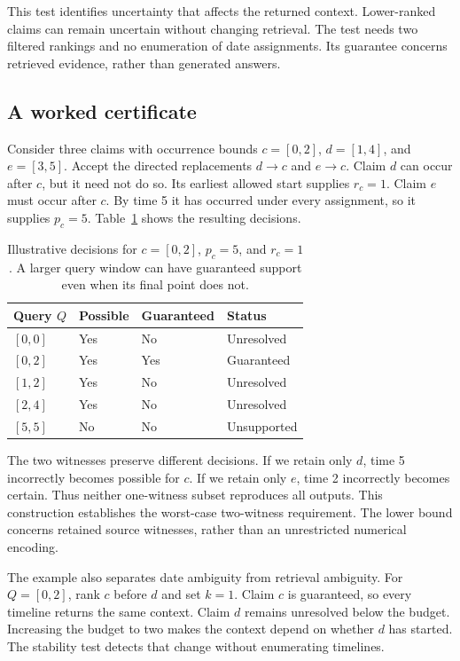 This test identifies uncertainty that affects the returned context.
Lower-ranked claims can remain uncertain without changing retrieval.
The test needs two filtered rankings and no enumeration of date assignments.
Its guarantee concerns retrieved evidence, rather than generated answers.

\subsection{A worked certificate}

Consider three claims with occurrence bounds $c=[0,2]$, $d=[1,4]$, and $e=[3,5]$.
Accept the directed replacements $d\to c$ and $e\to c$.
Claim $d$ can occur after $c$, but it need not do so.
Its earliest allowed start supplies $r_c=1$.
Claim $e$ must occur after $c$.
By time 5 it has occurred under every assignment, so it supplies $p_c=5$.
Table~\ref{tab:worked} shows the resulting decisions.

\begin{table}[t]
\centering\small
\begin{tabular}{@{}llll@{}}
\toprule
Query $Q$ & Possible & Guaranteed & Status\\
\midrule
$[0,0]$ & Yes & No & Unresolved\\
$[0,2]$ & Yes & Yes & Guaranteed\\
$[1,2]$ & Yes & No & Unresolved\\
$[2,4]$ & Yes & No & Unresolved\\
$[5,5]$ & No & No & Unsupported\\
\bottomrule
\end{tabular}
\caption{Illustrative decisions for $c=[0,2]$, $p_c=5$, and $r_c=1$. A larger query window can have guaranteed support even when its final point does not.}
\label{tab:worked}
\end{table}

The two witnesses preserve different decisions.
If we retain only $d$, time 5 incorrectly becomes possible for $c$.
If we retain only $e$, time 2 incorrectly becomes certain.
Thus neither one-witness subset reproduces all outputs.
This construction establishes the worst-case two-witness requirement.
The lower bound concerns retained source witnesses, rather than an unrestricted numerical encoding.

The example also separates date ambiguity from retrieval ambiguity.
For $Q=[0,2]$, rank $c$ before $d$ and set $k=1$.
Claim $c$ is guaranteed, so every timeline returns the same context.
Claim $d$ remains unresolved below the budget.
Increasing the budget to two makes the context depend on whether $d$ has started.
The stability test detects that change without enumerating timelines.

